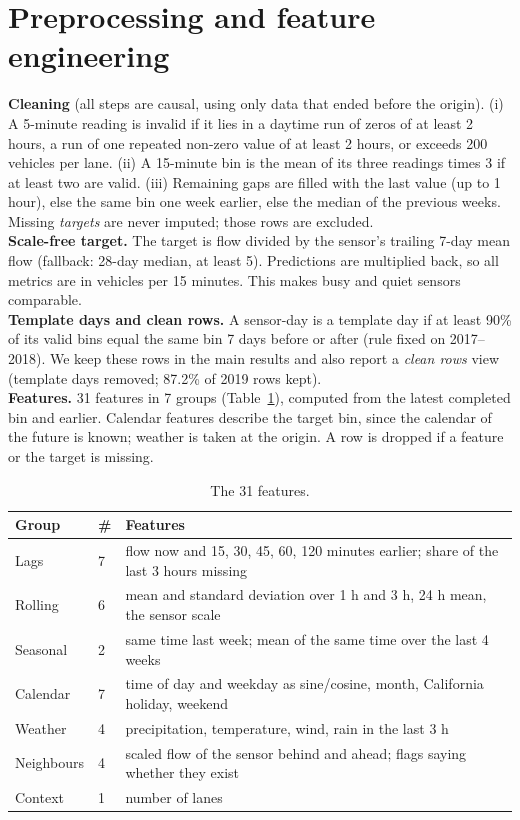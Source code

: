 ﻿\documentclass[11pt,a4paper]{article}
\begin{document}
\section{Preprocessing and feature engineering}\label{sec:prep}
\textbf{Cleaning} (all steps are causal, using only data that ended before the origin).
(i) A 5-minute reading is invalid if it lies in a daytime run of zeros of at least 2 hours, a run of one repeated non-zero value of at
least 2 hours, or exceeds 200 vehicles per lane. (ii) A 15-minute bin is the mean of its three readings times 3 if at least two are valid.
(iii) Remaining gaps are filled with the last value (up to 1 hour), else the same bin one week earlier, else the median of the previous weeks.
Missing \emph{targets} are never imputed; those rows are excluded.\\
\textbf{Scale-free target.} The target is flow divided by the sensor's trailing 7-day mean flow (fallback: 28-day median, at least 5).
Predictions are multiplied back, so all metrics are in vehicles per 15 minutes. This makes busy and quiet sensors comparable.\\
\textbf{Template days and clean rows.} A sensor-day is a template day if at least 90\% of its valid bins equal the same bin 7 days before or
after (rule fixed on 2017--2018). We keep these rows in the main results and also report a \emph{clean rows} view (template days removed; 87.2\% of 2019 rows kept).\\
\textbf{Features.} 31 features in 7 groups (Table~\ref{tab:feat}), computed from the latest completed bin and earlier. Calendar features
describe the target bin, since the calendar of the future is known; weather is taken at the origin. A row is dropped if a feature or the target is missing.

\begin{table}[H]\centering\small
\begin{tabular}{llp{9.6cm}}
\toprule Group & \# & Features \\ \midrule
Lags & 7 & flow now and 15, 30, 45, 60, 120 minutes earlier; share of the last 3 hours missing \\
Rolling & 6 & mean and standard deviation over 1 h and 3 h, 24 h mean, the sensor scale \\
Seasonal & 2 & same time last week; mean of the same time over the last 4 weeks \\
Calendar & 7 & time of day and weekday as sine/cosine, month, California holiday, weekend \\
Weather & 4 & precipitation, temperature, wind, rain in the last 3 h \\
Neighbours & 4 & scaled flow of the sensor behind and ahead; flags saying whether they exist \\
Context & 1 & number of lanes \\ \bottomrule
\end{tabular}
\caption{The 31 features.}\label{tab:feat}
\end{table}
\end{document}
